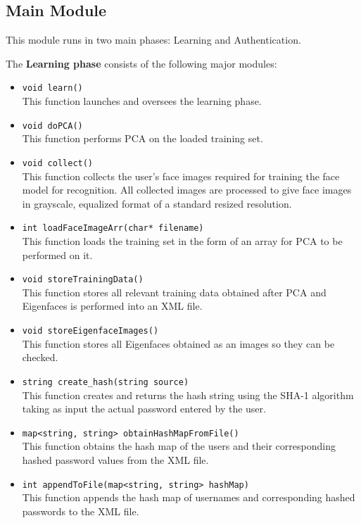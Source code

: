 \documentclass[12pt]{report}			%
\begin{document}
\subsection { Main Module }
This module runs in two main phases: Learning and Authentication.

\noindent The \textbf{Learning phase} consists of the following major modules:
\begin{itemize}
\item 
\verb+void learn()+\\
This function launches and oversees the learning phase.

\item 
\verb+void doPCA()+\\
This function performs PCA on the loaded training set.

\item 
\verb+void collect()+\\
This function collects the user's face images required for training the face model for recognition. All collected images are processed to give face images in grayscale, equalized format of a standard resized resolution. 

\item 
\verb+int loadFaceImageArr(char* filename)+\\
This function loads the training set in the form of an array for PCA to be performed on it.

\item 
\verb+void storeTrainingData()+\\
This function stores all relevant training data obtained after PCA and Eigenfaces is performed into an XML file.

\item 
\verb+void storeEigenfaceImages()+\\
This function stores all Eigenfaces obtained as an images so they can be checked.

\item 
\verb+string create_hash(string source)+\\
This function creates and returns the hash string using the SHA-1 algorithm taking as input the actual password entered by the user.

\item 
\verb+map<string, string> obtainHashMapFromFile()+\\
This function obtains the hash map of the users and their corresponding hashed password values from the XML file.

\item 
\verb+int appendToFile(map<string, string> hashMap)+\\
This function appends the hash map of usernames and corresponding hashed passwords to the XML file.

\end{itemize}
\end{document}
